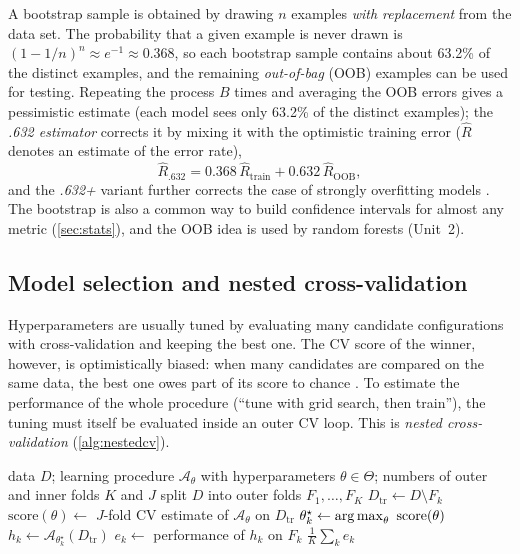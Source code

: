 A bootstrap sample is obtained by drawing $n$ examples \emph{with replacement} from the data
set. The probability that a given example is never drawn is $(1-1/n)^n\approx e^{-1}\approx
0.368$, so each bootstrap sample contains about 63.2\% of the distinct examples, and the
remaining \emph{out-of-bag} (OOB) examples can be used for testing. Repeating the process $B$
times and averaging the OOB errors gives a pessimistic estimate (each model sees only 63.2\%
of the distinct examples); the \emph{.632 estimator} corrects it by mixing it with the
optimistic training error ($\widehat R$ denotes an estimate of the error rate),
\begin{equation}
  \widehat R_{.632}=0.368\,\widehat R_{\text{train}}+0.632\,\widehat R_{\text{OOB}},
\end{equation}
and the \emph{.632+} variant further corrects the case of strongly overfitting models
\citep{efron1997improvements}. The bootstrap is also a common way to build confidence
intervals for almost any metric (\cref{sec:stats}), and the OOB idea is used by random forests
(Unit~2).

\subsection{Model selection and nested cross-validation}

Hyperparameters are usually tuned by evaluating many candidate configurations with
cross-validation and keeping the best one. The CV score of the winner, however, is
optimistically biased: when many candidates are compared on the same data, the best one owes part of its score to chance \citep{varma2006bias,cawley2010over}. To estimate the performance of
the whole procedure (``tune with grid search, then train''), the tuning must itself be
evaluated inside an outer CV loop. This is \emph{nested cross-validation}
(\cref{alg:nestedcv}).

\begin{algorithm}[htbp]
\caption{Nested cross-validation}\label{alg:nestedcv}
\begin{algorithmic}[1]
\Require data $D$; learning procedure $\mathcal A_\theta$ with hyperparameters
         $\theta\in\Theta$; numbers of outer and inner folds $K$ and $J$
\State split $D$ into outer folds $F_1,\dots,F_K$
  \State $D_{\text{tr}}\gets D\setminus F_k$
   
    \State $\text{score}(\theta)\gets$ $J$-fold CV estimate of $\mathcal A_\theta$ on $D_{\text{tr}}$
  \EndFor
  \State $\theta_k^\star\gets\argmax_\theta\ \text{score}(\theta)$
  \State $h_k\gets\mathcal A_{\theta_k^\star}(D_{\text{tr}})$ 
  \State $e_k\gets$ performance of $h_k$ on $F_k$ 
\EndFor
\State \Return $\frac1K\sum_{k}e_k$ 
\end{algorithmic}
\end{algorithm}

